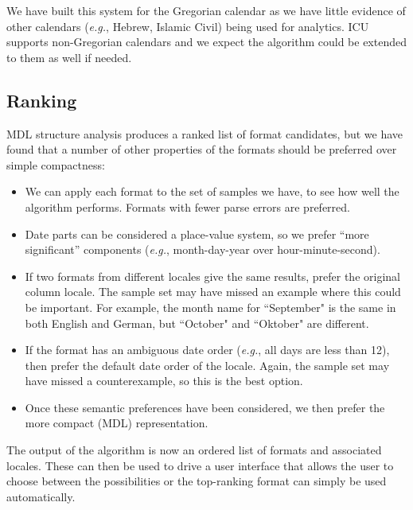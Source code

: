 We have built this system for the Gregorian calendar as we have little evidence of other calendars (\textit{e.g.}, Hebrew, Islamic Civil) being used for analytics. 
ICU supports non-Gregorian calendars and we expect the algorithm could be extended to them as well if needed.

\subsection{Ranking}
MDL structure analysis produces a ranked list of format candidates, but we have found that a number of other properties of the formats should be preferred over simple compactness:
\begin{itemize}
\setlength\itemsep{0em}
\item We can apply each format to the set of samples we have, to see how well the algorithm performs. Formats with fewer parse errors are preferred.
\item Date parts can be considered a place-value system, so we prefer ``more significant'' components (\textit{e.g.}, month-day-year over hour-minute-second).
\item If two formats from different locales give the same results, prefer the original column locale. The sample set may have missed an example where this could be important. For example, the month name for ``September" is the same in both English and German, but ``October" and ``Oktober" are different.
\item If the format has an ambiguous date order (\textit{e.g.}, all days are less than 12), then prefer the default date order of the locale. Again, the sample set may have missed a counterexample, so this is the best option.
\item Once these semantic preferences have been considered, we then prefer the more compact (MDL) representation.
\end{itemize}

The output of the algorithm is now an ordered list of formats and associated locales. These can then be used to drive a user interface that allows the user to choose between the possibilities or the top-ranking format can simply be used automatically.
